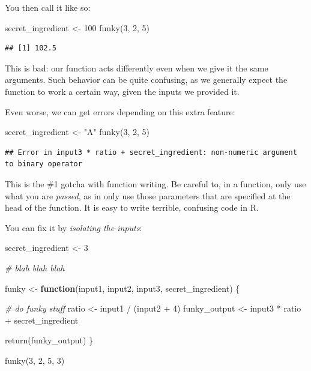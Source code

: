 \documentclass[
]{book}
\newenvironment{Shaded}{\begin{snugshade}}{\end{snugshade}}
\newcommand{\CommentTok}[1]{\textcolor[rgb]{0.56,0.35,0.01}{\textit{#1}}}
\newcommand{\ControlFlowTok}[1]{\textcolor[rgb]{0.13,0.29,0.53}{\textbf{#1}}}
\newcommand{\DecValTok}[1]{\textcolor[rgb]{0.00,0.00,0.81}{#1}}
\newcommand{\FunctionTok}[1]{\textcolor[rgb]{0.00,0.00,0.00}{#1}}
\newcommand{\NormalTok}[1]{#1}
\newcommand{\OtherTok}[1]{\textcolor[rgb]{0.56,0.35,0.01}{#1}}
\newcommand{\SpecialCharTok}[1]{\textcolor[rgb]{0.00,0.00,0.00}{#1}}
\newcommand{\StringTok}[1]{\textcolor[rgb]{0.31,0.60,0.02}{#1}}
\begin{document}
You then call it like so:

\begin{Shaded}
\begin{Highlighting}[]
\NormalTok{secret\_ingredient }\OtherTok{\textless{}{-}} \DecValTok{100}
\FunctionTok{funky}\NormalTok{(}\DecValTok{3}\NormalTok{, }\DecValTok{2}\NormalTok{, }\DecValTok{5}\NormalTok{)}
\end{Highlighting}
\end{Shaded}

\begin{verbatim}
## [1] 102.5
\end{verbatim}

This is bad: our function acts differently even when we give it the same arguments.
Such behavior can be quite confusing, as we generally expect the function to work a certain way, given the inputs we provided it.

Even worse, we can get errors depending on this extra feature:

\begin{Shaded}
\begin{Highlighting}[]
\NormalTok{secret\_ingredient }\OtherTok{\textless{}{-}} \StringTok{"A"}
\FunctionTok{funky}\NormalTok{(}\DecValTok{3}\NormalTok{, }\DecValTok{2}\NormalTok{, }\DecValTok{5}\NormalTok{)}
\end{Highlighting}
\end{Shaded}

\begin{verbatim}
## Error in input3 * ratio + secret_ingredient: non-numeric argument to binary operator
\end{verbatim}

This is the \#1 gotcha with function writing.
Be careful to, in a function, only use what you are \emph{passed}, as in only use those parameters that are specified at the head of the function.
It is easy to write terrible, confusing code in R.

You can fix it by \emph{isolating the inputs}:

\begin{Shaded}
\begin{Highlighting}[]
\NormalTok{secret\_ingredient }\OtherTok{\textless{}{-}} \DecValTok{3}

\CommentTok{\# blah blah blah}

\NormalTok{funky }\OtherTok{\textless{}{-}} \ControlFlowTok{function}\NormalTok{(input1, input2, input3, secret\_ingredient) \{}
  
  \CommentTok{\# do funky stuff}
\NormalTok{  ratio }\OtherTok{\textless{}{-}}\NormalTok{ input1 }\SpecialCharTok{/}\NormalTok{ (input2 }\SpecialCharTok{+} \DecValTok{4}\NormalTok{)}
\NormalTok{  funky\_output }\OtherTok{\textless{}{-}}\NormalTok{ input3 }\SpecialCharTok{*}\NormalTok{ ratio }\SpecialCharTok{+}\NormalTok{ secret\_ingredient}
  
  \FunctionTok{return}\NormalTok{(funky\_output)  }
\NormalTok{\}}

\FunctionTok{funky}\NormalTok{(}\DecValTok{3}\NormalTok{, }\DecValTok{2}\NormalTok{, }\DecValTok{5}\NormalTok{, }\DecValTok{3}\NormalTok{)}
\end{Highlighting}
\end{Shaded}
\end{document}
